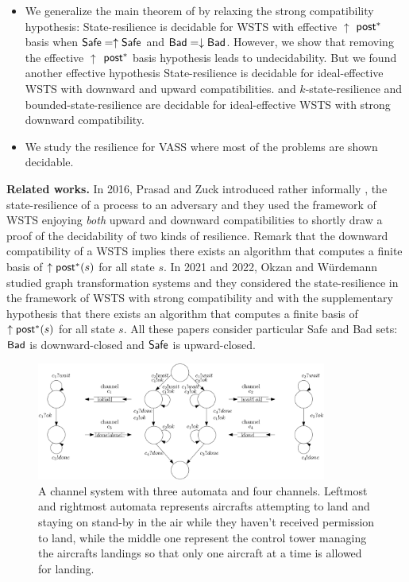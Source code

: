 \begin{itemize}
\item We generalize the main theorem of \cite{DBLP:journals/corr/abs-2108-00889,DBLP:conf/gg/Ozkan22} by relaxing the strong compatibility hypothesis: {\sc State-resilience} is decidable for 
 WSTS with effective 
$\uparrow$ $\textsf{post}^*$ basis
when
$\textsf{Safe}=\uparrow \textsf{Safe}$
and $\textsf{Bad}=\downarrow \textsf{Bad}$. However, we show that removing the effective 
$\uparrow$ $\textsf{post}^*$ basis hypothesis leads to undecidability. But we found another effective hypothesis {\sc State-resilience} is decidable for ideal-effective WSTS with downward and upward compatibilities. and {\sc $k$-state-resilience} and {\sc bounded-state-resilience} are decidable for ideal-effective WSTS with strong downward compatibility.

\item We study the resilience for VASS where most of the problems are shown decidable.
\end{itemize}


{\bf Related works.} 
In 2016, Prasad and Zuck introduced rather informally \cite{DBLP:journals/corr/PrasadZ16}, the state-resilience of a process to an adversary and they used the framework of WSTS enjoying \emph{both} upward and downward compatibilities to shortly draw a proof of the decidability of two kinds of resilience. Remark that the downward compatibility of a WSTS implies  there exists an algorithm that computes a finite basis of $\uparrow \textsf{post}^*(s)$ for all state $s$. In 2021 and 2022, Okzan and Würdemann \cite{DBLP:journals/corr/abs-2108-00889,DBLP:conf/gg/Ozkan22} studied graph transformation systems and they considered the state-resilience in the framework of WSTS with strong compatibility and with the supplementary hypothesis that there exists an algorithm that computes a finite basis of $\uparrow \textsf{post}^*(s)$ for all state $s$. All these papers consider particular Safe and Bad sets: $\textsf{Bad}$ is downward-closed and $\textsf{Safe}$ is upward-closed.
 



\begin{center}
	\begin{figure}
			\hspace{0.75cm}
\includegraphics[width=0.85\textwidth]{FigureB}
	\caption{A channel system with three automata and four channels. Leftmost and rightmost automata represents aircrafts attempting to land and staying on stand-by in the air while they haven't received permission to land, while the middle one represent the control tower managing the aircrafts landings so that only one aircraft at a time is allowed for landing.}
					\label{air control}
	\end{figure}
\end{center}

